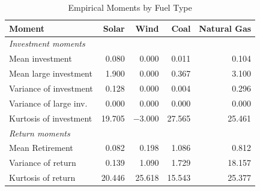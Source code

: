 \documentclass[12pt]{article}
\begin{document}
\begin{table}[htbp]
\centering
\caption{Empirical Moments by Fuel Type}
\label{tab:empirical_moments}
\begin{tabular}{lrrrr}
\toprule
Moment & Solar & Wind & Coal & Natural Gas \\
\midrule
\multicolumn{5}{l}{\textit{Investment moments}} \\
\quad Mean investment         & 0.080  & 0.000  & 0.011          & 0.104  \\
\quad Mean large investment   & 1.900  & 0.000  & 0.367          & 3.100  \\
\quad Variance of investment  & 0.128  & 0.000  & 0.004          & 0.296  \\
\quad Variance of large inv.  & 0.000  & 0.000  & 0.000          & 0.000  \\
\quad Kurtosis of investment  & 19.705 & $-3.000$ & 27.565       & 25.461 \\
\midrule
\multicolumn{5}{l}{\textit{Return moments}} \\
\quad Mean Retirement             & 0.082  & 0.198  & 1.086    & 0.812  \\
\quad Variance of return      & 0.139  & 1.090  & 1.729 & 18.157 \\
\quad Kurtosis of return      & 20.446 & 25.618 & 15.543         & 25.377 \\
\bottomrule
\end{tabular}
\label{Tab::MomentsTable}
\end{table}
\end{document}
